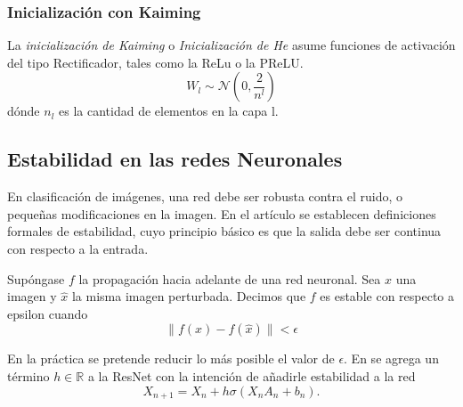 \subsubsection{Inicialización con Kaiming}
La \textsl{inicialización de Kaiming} o \textsl{Inicialización de He} \cite{kaiming} asume funciones de activación del tipo Rectificador, tales como la ReLu o la PReLU. 
\begin{equation}
    W_l \sim \mathcal{N} \left(0, \frac{2}{n^l}  \right)
\end{equation}
dónde $n_l$ es la cantidad de elementos en la capa l.

\subsection{Estabilidad en las redes Neuronales}
\label{resnet_stability_introduction}
En clasificación de imágenes, una red debe ser robusta contra el ruido, o pequeñas modificaciones en la imagen.  En el artículo \cite{CNNdefinition} se establecen definiciones formales de estabilidad, cuyo principio básico es que la salida debe ser continua con respecto a la entrada.

\begin{definition}
    Supóngase $f$ la propagación hacia adelante de una red neuronal. Sea $x$ una imagen y $\hat x$ la misma imagen perturbada. Decimos que $f$ es estable con respecto a epsilon cuando 
    \begin{equation}
        \|f(x)-f(\hat x)\| < \epsilon
    \end{equation}
\end{definition}
En la práctica se pretende reducir lo más posible el valor de $\epsilon$. En \cite{stable_resnets} se agrega un término $h\in \mathbb R$ a la ResNet con la intención de añadirle estabilidad a la red
\begin{equation}
    X_{n+1} = X_n + h\sigma(X_nA_n + b_n).
\end{equation}